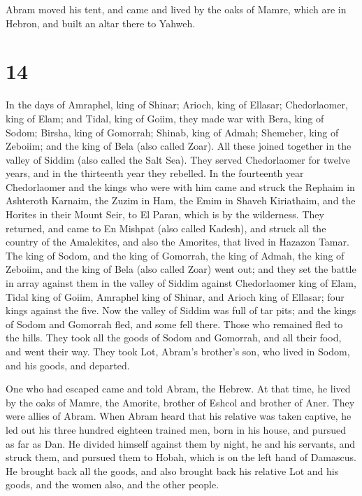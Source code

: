  Abram moved his tent, and came and lived by the oaks of
Mamre, which are in Hebron, and built an altar there to Yahweh.

\hypertarget{section-13}{%
\section{14}\label{section-13}}

 In the days of Amraphel, king of Shinar; Arioch, king of
Ellasar; Chedorlaomer, king of Elam; and Tidal, king of Goiim,
 they made war with Bera, king of Sodom; Birsha, king of
Gomorrah; Shinab, king of Admah; Shemeber, king of Zeboiim; and the king
of Bela (also called Zoar).  All these joined together in
the valley of Siddim (also called the Salt Sea).  They
served Chedorlaomer for twelve years, and in the thirteenth year they
rebelled.  In the fourteenth year Chedorlaomer and the kings
who were with him came and struck the Rephaim in Ashteroth Karnaim, the
Zuzim in Ham, the Emim in Shaveh Kiriathaim,  and the
Horites in their Mount Seir, to El Paran, which is by the wilderness.
 They returned, and came to En Mishpat (also called Kadesh),
and struck all the country of the Amalekites, and also the Amorites,
that lived in Hazazon Tamar.  The king of Sodom, and the
king of Gomorrah, the king of Admah, the king of Zeboiim, and the king
of Bela (also called Zoar) went out; and they set the battle in array
against them in the valley of Siddim  against Chedorlaomer
king of Elam, Tidal king of Goiim, Amraphel king of Shinar, and Arioch
king of Ellasar; four kings against the five.  Now the
valley of Siddim was full of tar pits; and the kings of Sodom and
Gomorrah fled, and some fell there. Those who remained fled to the
hills.  They took all the goods of Sodom and Gomorrah, and
all their food, and went their way.  They took Lot, Abram's
brother's son, who lived in Sodom, and his goods, and departed.

 One who had escaped came and told Abram, the Hebrew. At
that time, he lived by the oaks of Mamre, the Amorite, brother of Eshcol
and brother of Aner. They were allies of Abram.  When Abram
heard that his relative was taken captive, he led out his three hundred
eighteen trained men, born in his house, and pursued as far as Dan.
 He divided himself against them by night, he and his
servants, and struck them, and pursued them to Hobah, which is on the
left hand of Damascus.  He brought back all the goods, and
also brought back his relative Lot and his goods, and the women also,
and the other people.

